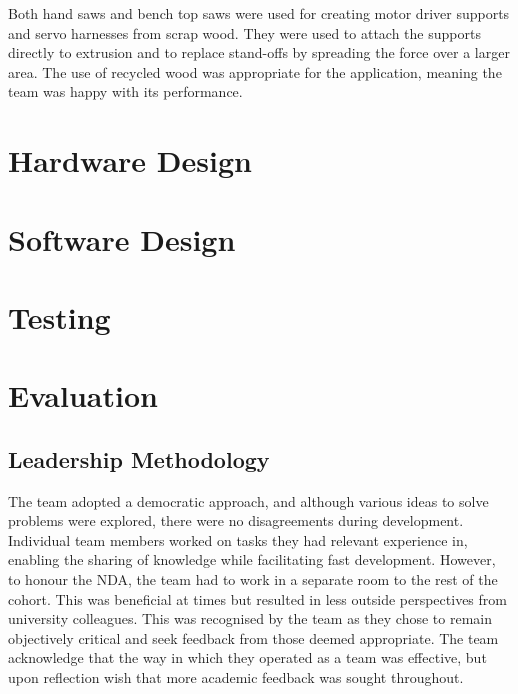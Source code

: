 \documentclass [12pt]{article}
\begin{document}
Both hand saws and bench top saws were used for creating motor driver supports and servo harnesses from scrap wood. They were used to attach the supports directly to extrusion and to replace stand-offs by spreading the force over a larger area. The use of recycled wood was appropriate for the application, meaning the team was happy with its performance.  

\newpage
\section{Hardware Design}

\newpage
\section{Software Design}

\newpage
\section{Testing}

\newpage
\section{Evaluation}

\subsection{Leadership Methodology}
The team adopted a democratic approach, and although various ideas to solve problems were explored, there were no disagreements during development. Individual team members worked on tasks they had relevant experience in, enabling the sharing of knowledge while facilitating fast development. However, to honour the NDA, the team had to work in a separate room to the rest of the cohort. This was beneficial at times but resulted in less outside perspectives from university colleagues. This was recognised by the team as they chose to remain objectively critical and seek feedback from those deemed appropriate. The team acknowledge that the way in which they operated as a team was effective, but upon reflection wish that more academic feedback was sought throughout. 
\end{document}
